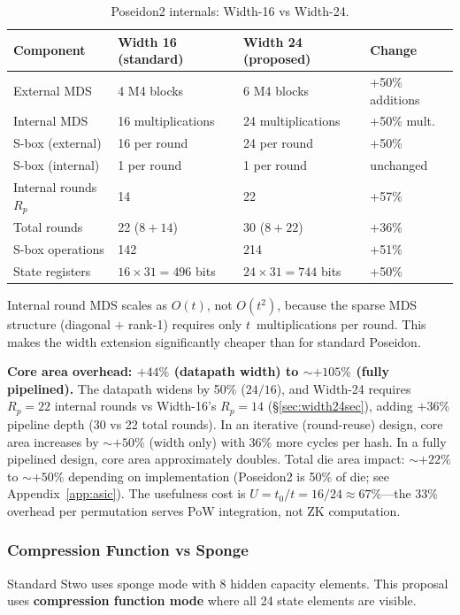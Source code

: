 \documentclass[11pt,a4paper]{article}
\begin{document}
\begin{table}[h]
\centering
\small
\begin{tabular}{@{}llll@{}}
\toprule
Component & Width 16 (standard) & Width 24 (proposed) & Change \\
\midrule
External MDS & 4 M4 blocks & 6 M4 blocks & +50\% additions \\
Internal MDS & 16 multiplications & 24 multiplications & +50\% mult. \\
S-box (external) & 16 per round & 24 per round & +50\% \\
S-box (internal) & 1 per round & 1 per round & unchanged \\
Internal rounds $R_p$ & 14 & 22 & +57\% \\
Total rounds & 22 ($8{+}14$) & 30 ($8{+}22$) & +36\% \\
S-box operations & 142 & 214 & +51\% \\
State registers & $16 \times 31 = 496$ bits & $24 \times 31 = 744$ bits & +50\% \\
\bottomrule
\end{tabular}
\caption{Poseidon2 internals: Width-16 vs Width-24.}
\label{tab:internals}
\end{table}

Internal round MDS scales as $O(t)$, not $O(t^2)$, because the sparse MDS structure (diagonal $+$ rank-1) requires only $t$~multiplications per round. This makes the width extension significantly cheaper than for standard Poseidon.

\textbf{Core area overhead: $+44\%$ (datapath width) to ${\sim}+105\%$ (fully pipelined).} The datapath widens by 50\% ($24/16$), and Width-24 requires $R_p = 22$ internal rounds vs Width-16's $R_p = 14$ (\S\ref{sec:width24sec}), adding $+36\%$ pipeline depth (30 vs 22 total rounds). In an iterative (round-reuse) design, core area increases by ${\sim}+50\%$ (width only) with 36\% more cycles per hash. In a fully pipelined design, core area approximately doubles. Total die area impact: ${\sim}+22\%$ to ${\sim}+50\%$ depending on implementation (Poseidon2 is 50\% of die; see Appendix~\ref{app:asic}). The usefulness cost is $U = t_0/t = 16/24 \approx 67\%$---the 33\% overhead per permutation serves PoW integration, not ZK computation.

\subsubsection{Compression Function vs Sponge}

Standard Stwo uses sponge mode with 8 hidden capacity elements. This proposal uses \textbf{compression function mode} where all 24 state elements are visible.
\end{document}
